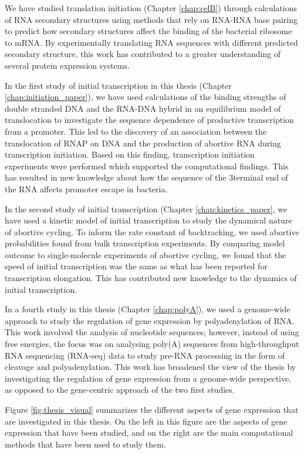 We have studied translation initiation (Chapter \ref{chap:celB}) through
calculations of RNA secondary structures using methods that rely on RNA-RNA
base pairing to predict how secondary structures affect the binding of the
bacterial ribosome to mRNA. By experimentally translating RNA sequences with
different predicted secondary structure, this work has contributed to a greater
understanding of several protein expression systems.

In the first study of initial transcription in this thesis (Chapter
\ref{chap:initiation_paper}), we have used calculations of the binding
strengths of double stranded DNA and the RNA-DNA hybrid in an equilibrium
model of translocation to investigate the sequence dependence of productive
transcription from a promoter. This led to the discovery of an association
between the translocation of RNAP on DNA and the production of abortive RNA
during transcription initiation. Based on this finding, transcription
initiation experiments were performed which supported the computational
findings. This has resulted in new knowledge about how the sequence of the
3\ppp terminal end of the RNA affects promoter escape in bacteria.

In the second study of initial transcription (Chapter 
\ref{chap:kinetics_paper}, we have used a kinetic model of initial
transcription to study the dynamical nature of abortive cycling. To inform the
rate constant of backtracking, we used abortive probabilities found from bulk
transcription experiments. By comparing model outcome to single-molecule
experiments of abortive cycling, we found that the speed of initial
transcription was the same as what has been reported for transcription
elongation. This has contributed new knowledge to the dynamics of initial
transcription.

In a fourth study in this thesis (Chapter \ref{chap:polyA}), we used a
genome-wide approach to study the regulation of gene expression by
polyadenylation of RNA. This work involved the analysis of nucleotide
sequences; however, instead of using free energies, the focus was on analysing
poly(A) sequences from high-throughput RNA sequencing (RNA-seq) data to study
pre-RNA processing in the form of cleavage and polyadenylation. This work has
broadened the view of the thesis by investigating the regulation of gene
expression from a genome-wide perspective, as opposed to the gene-centric
approach of the two first studies.

Figure \ref{fig:thesis_visual} summarizes the different aspects of gene
expression that are investigated in this thesis. On the left in this figure are
the aspects of gene expression that have been studied, and on the right are the
main computational methods that have been used to study them.

